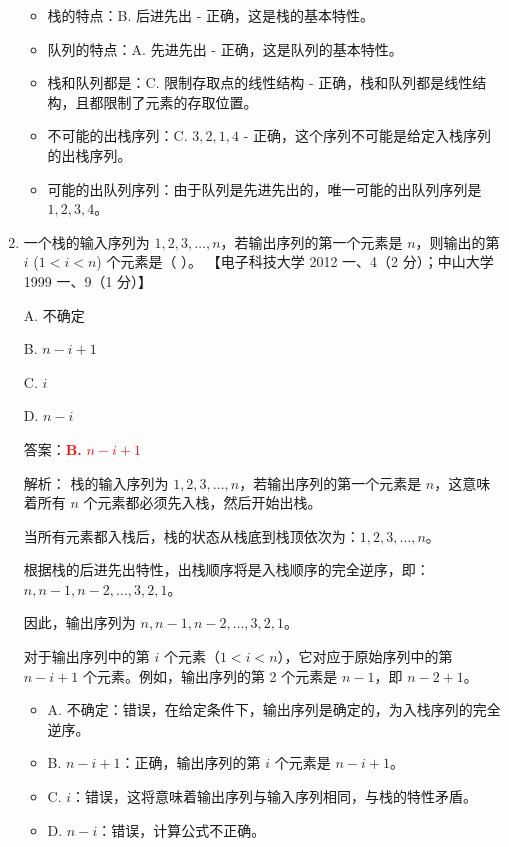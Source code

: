 \documentclass[lang=cn,newtx,10pt,scheme=chinese]{../../../elegantbook}
\begin{document}
\begin{enumerate}
    \begin{itemize}
        \item 栈的特点：B. 后进先出 - 正确，这是栈的基本特性。
        \item 队列的特点：A. 先进先出 - 正确，这是队列的基本特性。
        \item 栈和队列都是：C. 限制存取点的线性结构 - 正确，栈和队列都是线性结构，且都限制了元素的存取位置。
        \item 不可能的出栈序列：C. $3, 2, 1, 4$ - 正确，这个序列不可能是给定入栈序列的出栈序列。
        \item 可能的出队列序列：由于队列是先进先出的，唯一可能的出队列序列是 $1, 2, 3, 4$。
    \end{itemize}

    \item 一个栈的输入序列为 $1, 2, 3, \ldots, n$，若输出序列的第一个元素是 $n$，则输出的第 $i$ ($1 < i < n$) 个元素是（ ）。  
    【电子科技大学 2012 一、4（2 分）；中山大学 1999 一、9（1 分）】  

    A. 不确定  

    B. $n - i + 1$  

    C. $i$  

    D. $n-i$  

    答案：\textcolor{red}{\textbf{B.} $n - i + 1$}

    解析：
    栈的输入序列为 $1, 2, 3, \ldots, n$，若输出序列的第一个元素是 $n$，这意味着所有 $n$ 个元素都必须先入栈，然后开始出栈。
    
    当所有元素都入栈后，栈的状态从栈底到栈顶依次为：$1, 2, 3, \ldots, n$。
    
    根据栈的后进先出特性，出栈顺序将是入栈顺序的完全逆序，即：$n, n-1, n-2, \ldots, 3, 2, 1$。
    
    因此，输出序列为 $n, n-1, n-2, \ldots, 3, 2, 1$。
    
    对于输出序列中的第 $i$ 个元素（$1 < i < n$），它对应于原始序列中的第 $n - i + 1$ 个元素。例如，输出序列的第 2 个元素是 $n-1$，即 $n - 2 + 1$。

    \begin{itemize}
        \item A. 不确定：错误，在给定条件下，输出序列是确定的，为入栈序列的完全逆序。
        \item B. $n - i + 1$：正确，输出序列的第 $i$ 个元素是 $n - i + 1$。
        \item C. $i$：错误，这将意味着输出序列与输入序列相同，与栈的特性矛盾。
        \item D. $n-i$：错误，计算公式不正确。
    \end{itemize}


\end{enumerate}
\end{document}
